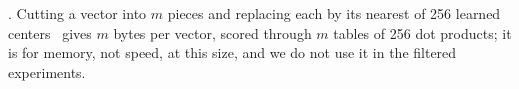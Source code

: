 .
Cutting a vector into $m$ pieces and replacing each by its nearest of 256 learned
centers~\cite{jegou2011} gives $m$ bytes per vector, scored through $m$ tables of 256
dot products; it is for memory, not speed, at this size, and we do not use it in the
filtered experiments.
